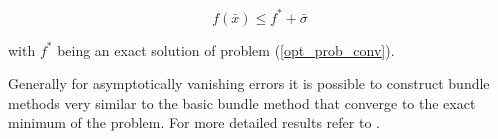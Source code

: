 \begin{equation*}
	f(\bar{x}) \leq f^*+\bar{\sigma} 
\end{equation*}

with \(f^*\) being an exact solution of problem (\ref{opt_prob_conv}).

Generally for asymptotically vanishing errors it is possible to construct bundle methods very similar to the basic bundle method that converge to the exact minimum of the problem.
For more detailed results refer to \cite{Oliveira2014}.




 


